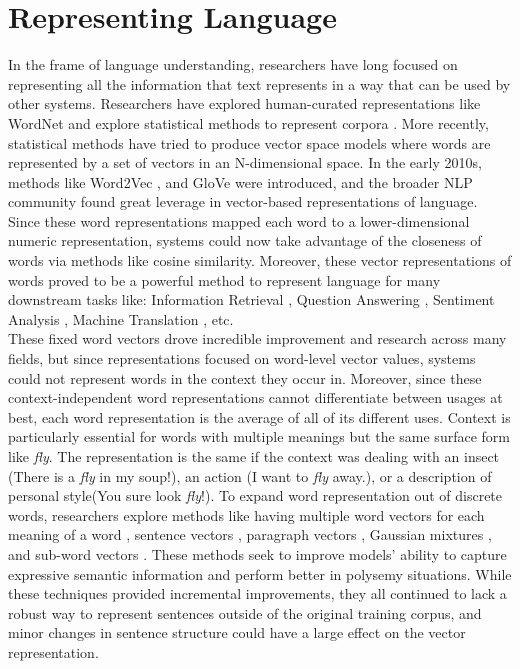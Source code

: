 \section{Representing Language}
\label{chap:intro:sec:lm}
In the frame of language understanding, researchers have long focused on representing all the information that text represents in a way that can be used by other systems. Researchers have explored human-curated representations like WordNet \cite{Miller1992WordNetAL}  and explore statistical methods to represent corpora \cite{Leacock1993TowardsBC}. More recently, statistical methods have tried to produce vector space models where words are represented by a set of vectors in an N-dimensional space. In the early 2010s, methods like Word2Vec \cite{Mikolov2013EfficientEO}, and GloVe \cite{Pennington2014GloveGV} were introduced, and the broader NLP community found great leverage in vector-based representations of language. Since these word representations mapped each word to a lower-dimensional numeric representation, systems could now take advantage of the closeness of words via methods like cosine similarity. Moreover, these vector representations of words proved to be a powerful method to represent language for many downstream tasks like: Information Retrieval \cite{Roy2018UsingWE}, Question Answering \cite{Othman2017AWE}, Sentiment Analysis \cite{Zhou2016ECNUAS}, Machine Translation \cite{Zou2013BilingualWE}, etc. \\
These fixed word vectors drove incredible improvement and research across many fields, but since representations focused on word-level vector values, systems could not represent words in the context they occur in. Moreover, since these context-independent word representations cannot differentiate between usages at best, each word representation is the average of all of its different uses. Context is particularly essential for words with multiple meanings but the same surface form like \emph{fly}. The representation is the same if the context was dealing with an insect (There is a \emph{fly} in my soup!), an action (I want to \emph{fly} away.), or a description of personal style(You sure look \emph{fly}!). To expand word representation out of discrete words, researchers explore methods like having multiple word vectors for each meaning of a word \cite{Hu2016DifferentCL}, sentence vectors \cite{Kiros2015SkipThoughtV}, paragraph vectors \cite{Le2014DistributedRO}, Gaussian mixtures \cite{Athiwaratkun2017MultimodalWD}, and sub-word vectors \cite{Bojanowski2017EnrichingWV}. These methods seek to improve models' ability to capture expressive semantic information and perform better in polysemy situations. While these techniques provided incremental improvements, they all continued to lack a robust way to represent sentences outside of the original training corpus, and minor changes in sentence structure could have a large effect on the vector representation. \\ 
